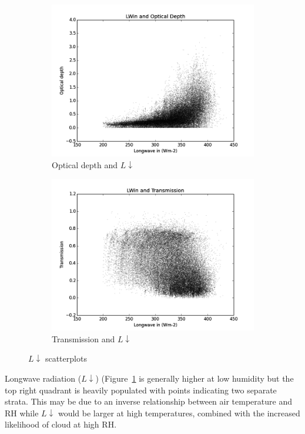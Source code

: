 \documentclass[a4paper,titlepage, twoside]{report}
\newcommand\Ldown{L\!\!\downarrow}
\begin{document}
\begin{figure}
\begin{subfigure}{0.48\textwidth}
\includegraphics[width=\textwidth]{005_LWin_tau.png}
\caption{Optical depth and $\Ldown$}
\end{subfigure}
\hfill
\begin{subfigure}{0.48\textwidth}
\includegraphics[width=\textwidth]{006_LWin_Tr.png}
\caption{Transmission and $\Ldown$}
\end{subfigure}
\caption{$\Ldown$ scatterplots}
\label{fig:data-2}
\end{figure}

Longwave radiation ($\Ldown$) (Figure~\ref{fig:data-2} is generally higher at low humidity but the top right quadrant is heavily populated with points indicating two separate strata.  This may be due to an inverse relationship between air temperature and $\mathrm{RH}$ while $\Ldown$ would be larger at high temperatures, combined with the increased likelihood of cloud at high $\mathrm{RH}$.
\end{document}
